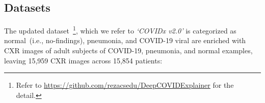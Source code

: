 \documentclass[conference]{IEEEtran}
\begin{document}
\subsection{Datasets}
\label{sec:ds}

The updated dataset~\footnote{Refer to \url{https://github.com/rezacsedu/DeepCOVIDExplainer} for the detail.}, which we refer to \emph{`COVIDx v2.0'} is categorized as normal~(i.e., no-findings), pneumonia, and COVID-19 viral are enriched with CXR images of adult subjects of COVID-19, pneumonia, and normal examples, leaving 15,959 CXR images across 15,854 patients: 

\end{document}
